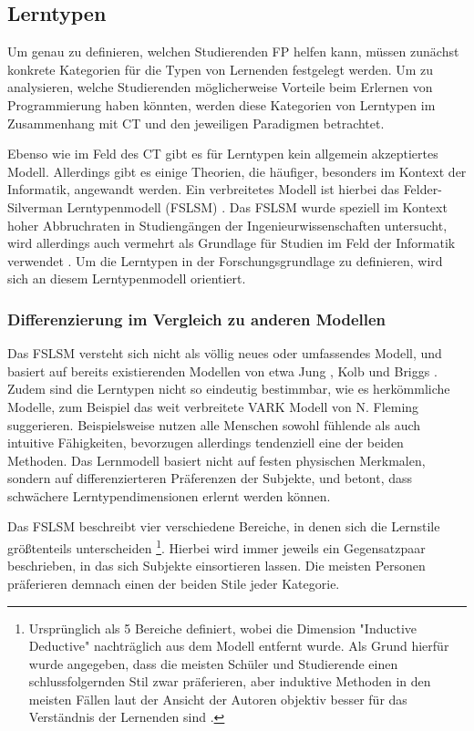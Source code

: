 \subsection{Lerntypen}
Um genau zu definieren, welchen Studierenden FP helfen kann, müssen zunächst konkrete Kategorien für die Typen von Lernenden festgelegt werden. Um zu analysieren, welche Studierenden möglicherweise Vorteile beim Erlernen von Programmierung haben könnten, werden diese Kategorien von Lerntypen im Zusammenhang mit CT und den jeweiligen Paradigmen betrachtet.

Ebenso wie im Feld des CT gibt es für Lerntypen kein allgemein akzeptiertes Modell. Allerdings gibt es einige Theorien, die häufiger, besonders im Kontext der Informatik, angewandt werden. Ein verbreitetes Modell ist hierbei das Felder-Silverman Lerntypenmodell (FSLSM) \cite{felder}. 
Das FSLSM wurde speziell im Kontext hoher Abbruchraten in Studiengängen der Ingenieurwissenschaften untersucht, wird allerdings auch vermehrt als Grundlage für Studien im Feld der Informatik verwendet \cite{kumar}.
Um die Lerntypen in der Forschungsgrundlage zu definieren, wird sich an diesem Lerntypenmodell orientiert.

\subsubsection{Differenzierung im Vergleich zu anderen Modellen}
Das FSLSM versteht sich nicht als völlig neues oder umfassendes Modell, und basiert auf bereits existierenden Modellen von etwa Jung \cite{jung}, Kolb \cite{kolb} und Briggs \cite{myers}.
Zudem sind die Lerntypen nicht so eindeutig bestimmbar, wie es herkömmliche Modelle, zum Beispiel das weit verbreitete VARK Modell von N. Fleming suggerieren.
Beispielsweise nutzen alle Menschen sowohl fühlende als auch intuitive Fähigkeiten, bevorzugen allerdings tendenziell eine der beiden Methoden. Das Lernmodell basiert nicht auf festen physischen Merkmalen, sondern auf differenzierteren Präferenzen der Subjekte, und betont, dass schwächere Lerntypendimensionen erlernt werden können.

Das FSLSM beschreibt vier verschiedene Bereiche, in denen sich die Lernstile größtenteils unterscheiden \footnote{Ursprünglich als 5 Bereiche definiert, wobei die Dimension "Inductive Deductive" nachträglich aus dem Modell entfernt wurde. Als Grund hierfür wurde angegeben, dass die meisten Schüler und Studierende einen schlussfolgernden Stil zwar präferieren, aber induktive Methoden in den meisten Fällen laut der Ansicht der Autoren objektiv besser für das Verständnis der Lernenden sind \cite{felder}.}. Hierbei wird immer jeweils ein Gegensatzpaar beschrieben, in das sich Subjekte einsortieren lassen. Die meisten Personen präferieren demnach einen der beiden Stile jeder Kategorie.

